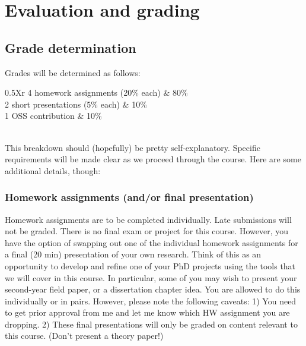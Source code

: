 \documentclass[12]{article}
\begin{document}
\section*{Evaluation and grading}

\subsection*{Grade determination}


Grades will be determined as follows:

\begin{table}[!h] \centering 
	\label{tab:grades} 
	\begin{tabularx}{0.5\textwidth}{Xr} 
		\toprule
		4 \times homework assignments (20\% each)	& 80\% \\
		2 \times short presentations (5\% each)		& 10\% \\
		1 \times OSS contribution					& 10\% \\
		\bottomrule
		\\
	\end{tabularx} 
\end{table} 

This breakdown should (hopefully) be pretty self-explanatory. Specific requirements will be made clear as we proceed through the course. Here are some additional details, though:

\vspace{-0.25cm}
\subsubsection*{Homework assignments (and/or final presentation)}

Homework assignments are to be completed individually. Late submissions will not be graded. There is no final exam or project for this course. However, you have the option of swapping out one of the individual homework assignments for a final (20 min) presentation of your own research. Think of this as an opportunity to develop and refine one of your PhD projects using the tools that we will cover in this course. In particular, some of you may wish to present your second-year field paper, or a dissertation chapter idea. You are allowed to do this individually or in pairs. However, please note the following caveats: 1) You need to get prior approval from me and let me know which HW assignment you are dropping. 2) These final presentations will only be graded on content relevant to this course. (Don't present a theory paper!)
\end{document}

